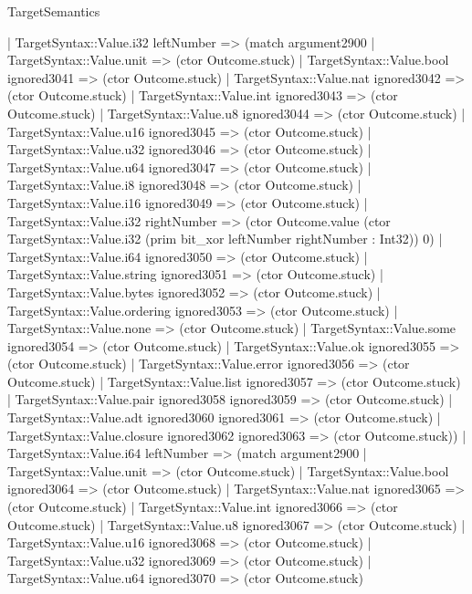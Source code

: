 \begin{lexlean}{TargetSemantics}
\begin{semanticmodule}
{            | TargetSyntax::Value.i32 leftNumber => (match argument2900
              | TargetSyntax::Value.unit => (ctor Outcome.stuck)
              | TargetSyntax::Value.bool ignored3041 => (ctor Outcome.stuck)
              | TargetSyntax::Value.nat ignored3042 => (ctor Outcome.stuck)
              | TargetSyntax::Value.int ignored3043 => (ctor Outcome.stuck)
              | TargetSyntax::Value.u8 ignored3044 => (ctor Outcome.stuck)
              | TargetSyntax::Value.u16 ignored3045 => (ctor Outcome.stuck)
              | TargetSyntax::Value.u32 ignored3046 => (ctor Outcome.stuck)
              | TargetSyntax::Value.u64 ignored3047 => (ctor Outcome.stuck)
              | TargetSyntax::Value.i8 ignored3048 => (ctor Outcome.stuck)
              | TargetSyntax::Value.i16 ignored3049 => (ctor Outcome.stuck)
              | TargetSyntax::Value.i32 rightNumber => (ctor Outcome.value (ctor TargetSyntax::Value.i32 (prim bit_xor leftNumber rightNumber : Int32)) 0)
              | TargetSyntax::Value.i64 ignored3050 => (ctor Outcome.stuck)
              | TargetSyntax::Value.string ignored3051 => (ctor Outcome.stuck)
              | TargetSyntax::Value.bytes ignored3052 => (ctor Outcome.stuck)
              | TargetSyntax::Value.ordering ignored3053 => (ctor Outcome.stuck)
              | TargetSyntax::Value.none => (ctor Outcome.stuck)
              | TargetSyntax::Value.some ignored3054 => (ctor Outcome.stuck)
              | TargetSyntax::Value.ok ignored3055 => (ctor Outcome.stuck)
              | TargetSyntax::Value.error ignored3056 => (ctor Outcome.stuck)
              | TargetSyntax::Value.list ignored3057 => (ctor Outcome.stuck)
              | TargetSyntax::Value.pair ignored3058 ignored3059 => (ctor Outcome.stuck)
              | TargetSyntax::Value.adt ignored3060 ignored3061 => (ctor Outcome.stuck)
              | TargetSyntax::Value.closure ignored3062 ignored3063 => (ctor Outcome.stuck))
            | TargetSyntax::Value.i64 leftNumber => (match argument2900
              | TargetSyntax::Value.unit => (ctor Outcome.stuck)
              | TargetSyntax::Value.bool ignored3064 => (ctor Outcome.stuck)
              | TargetSyntax::Value.nat ignored3065 => (ctor Outcome.stuck)
              | TargetSyntax::Value.int ignored3066 => (ctor Outcome.stuck)
              | TargetSyntax::Value.u8 ignored3067 => (ctor Outcome.stuck)
              | TargetSyntax::Value.u16 ignored3068 => (ctor Outcome.stuck)
              | TargetSyntax::Value.u32 ignored3069 => (ctor Outcome.stuck)
              | TargetSyntax::Value.u64 ignored3070 => (ctor Outcome.stuck)
}
\end{semanticmodule}
\end{lexlean}
